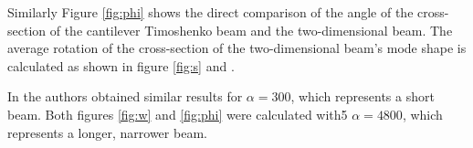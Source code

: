 \documentclass[../../main.tex]{subfiles}
\begin{document}
\begin{figure}[ht!]
\end{figure}
\FloatBarrier

Similarly Figure \ref{fig:phi} shows the direct comparison of the angle of the cross-section of the cantilever Timoshenko beam and the two-dimensional beam. The average rotation of the cross-section of the two-dimensional beam's mode shape is calculated as shown in figure \ref{fig:s} and \cite{LVV09}.

\FloatBarrier
\begin{figure}[ht!]
\end{figure}
\FloatBarrier

In \cite{LVV09} the authors obtained similar results for $\alpha=300$, which represents a short beam. Both figures \ref{fig:w} and \ref{fig:phi} were calculated with5 $\alpha = 4800$, which represents a longer, narrower beam. 
\end{document}
